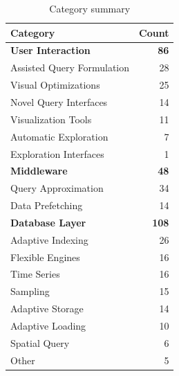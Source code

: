 \begin{table}[hptb]
  \small
  \begin{tabularx}{\textwidth}{X r} \hline
    \textbf{Category} & \textbf{Count} \\ \hline
    \textbf{User Interaction} & \textbf{86} \\
      \hspace{0.5em} Assisted Query Formulation & 28 \\
      \hspace{0.5em} Visual Optimizations & 25 \\
      \hspace{0.5em} Novel Query Interfaces & 14 \\
      \hspace{0.5em} Visualization Tools & 11 \\
      \hspace{0.5em} Automatic Exploration & 7 \\
      \hspace{0.5em} Exploration Interfaces & 1 \\
    \textbf{Middleware} & \textbf{48} \\
      \hspace{0.5em} Query Approximation & 34 \\
      \hspace{0.5em} Data Prefetching & 14 \\
    \textbf{Database Layer} & \textbf{108} \\
      \hspace{0.5em} Adaptive Indexing & 26 \\
      \hspace{0.5em} Flexible Engines & 16 \\
      \hspace{0.5em} Time Series & 16 \\
      \hspace{0.5em} Sampling & 15 \\
      \hspace{0.5em} Adaptive Storage & 14 \\
      \hspace{0.5em} Adaptive Loading & 10 \\
      \hspace{0.5em} Spatial Query & 6 \\
      \hspace{0.5em} Other & 5
  \end{tabularx}
  \caption{Category summary}\label{tab:mapping/category_summary}
\end{table}

